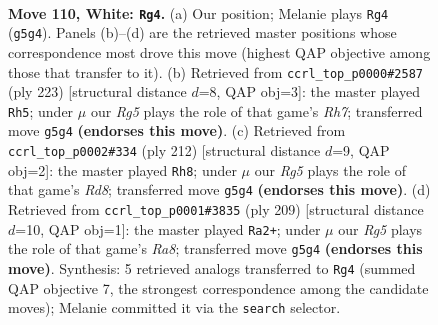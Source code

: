 \documentclass[11pt]{article}
\begin{document}
\clearpage

\begin{figure}[p]\centering
\begin{subfigure}{0.46\textwidth}\centering
\resizebox{\linewidth}{!}{%
\newchessgame
\chessboard[
  setfen={1B5k/8/8/6RP/8/4rp2/K7/8 w - - 12 110},
  showmover=false,
  pgfstyle=straightmove, color=movearrow, markmove={g5-g4}
]}
\caption{}
\end{subfigure}\hfill
\begin{subfigure}{0.46\textwidth}\centering
\resizebox{\linewidth}{!}{%
\newchessgame
\chessboard[
  setfen={8/6k1/3PR2p/8/8/5K2/7r/8 b - - 0 112},
  showmover=false,
  pgfstyle=straightmove, color=movearrow, markmove={h2-h5}
]}
\caption{}
\end{subfigure}
\\[4pt]
\begin{subfigure}{0.46\textwidth}\centering
\resizebox{\linewidth}{!}{%
\newchessgame
\chessboard[
  setfen={3R4/8/8/8/2pPk3/2r5/5K2/8 w - - 4 107},
  showmover=false,
  pgfstyle=straightmove, color=movearrow, markmove={d8-h8}
]}
\caption{}
\end{subfigure}\hfill
\begin{subfigure}{0.46\textwidth}\centering
\resizebox{\linewidth}{!}{%
\newchessgame
\chessboard[
  setfen={8/8/3R1P2/8/5kp1/8/6K1/r7 b - - 9 105},
  showmover=false,
  pgfstyle=straightmove, color=movearrow, markmove={a1-a2}
]}
\caption{}
\end{subfigure}
\caption{\textbf{Move 110, White: \texttt{Rg4}.} (a) Our position; Melanie plays \texttt{Rg4} (\texttt{g5g4}). Panels (b)--(d) are the retrieved master positions whose correspondence most drove this move (highest QAP objective among those that transfer to it). (b) Retrieved from \texttt{ccrl\_top\_p0000\#2587} (ply 223) [structural distance $d$=8, QAP obj=3]: the master played \texttt{Rh5}; under $\mu$ our \emph{Rg5} plays the role of that game's \emph{Rh7}; transferred move \texttt{g5g4} \textbf{(endorses this move)}. (c) Retrieved from \texttt{ccrl\_top\_p0002\#334} (ply 212) [structural distance $d$=9, QAP obj=2]: the master played \texttt{Rh8}; under $\mu$ our \emph{Rg5} plays the role of that game's \emph{Rd8}; transferred move \texttt{g5g4} \textbf{(endorses this move)}. (d) Retrieved from \texttt{ccrl\_top\_p0001\#3835} (ply 209) [structural distance $d$=10, QAP obj=1]: the master played \texttt{Ra2+}; under $\mu$ our \emph{Rg5} plays the role of that game's \emph{Ra8}; transferred move \texttt{g5g4} \textbf{(endorses this move)}. Synthesis: 5 retrieved analogs transferred to \texttt{Rg4} (summed QAP objective 7, the strongest correspondence among the candidate moves); Melanie committed it via the \texttt{search} selector.}
\label{fig:thought-m218}
\end{figure}
\end{document}
